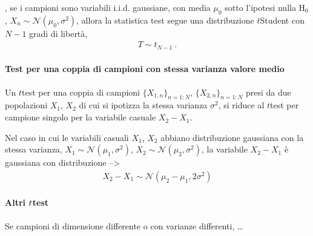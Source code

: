 \documentclass[letterpaper,10pt,italian]{jupyterBook}
\begin{document}
\sphinxAtStartPar
{}
{\hyperref[\detokenize{ch/proofs:proof-t-test-gaussian}]{}}, se i campioni sono variabili i.i.d. gaussiane, con media \(\mu_0\) sotto l’ipotesi nulla \(\text{H}_0\), \(X_n \sim \mathscr{N}(\mu_0, \sigma^2)\), allora la statistica test segue una distribuzione \(t\)\sphinxhyphen{}Student con \(N-1\) gradi di libertà,
\begin{equation*}
\begin{split}T \sim t_{N-1} \ .\end{split}
\end{equation*}
\sphinxAtStartPar
{} 


\paragraph{Test per una coppia di campioni con stessa varianza \sphinxhyphen{} valore medio}
\label{\detokenize{ch/statistics/hp-test-single:test-per-una-coppia-di-campioni-con-stessa-varianza-valore-medio}}\label{\detokenize{ch/statistics/hp-test-single:hp-test-single-t-tests-pair}}
\sphinxAtStartPar
Un \(t\)\sphinxhyphen{}test per una coppia di campioni \(\{ X_{1,n} \}_{n=1:N}\), \(\{ X_{2,n} \}_{n=1:N}\) presi da due popolazioni \(X_1\), \(X_2\) di cui si ipotizza la stessa varianza \(\sigma^2\), si riduce al \(t\)\sphinxhyphen{}test per campione singolo per la variabile casuale \(X_2 - X_1\).

\sphinxAtStartPar
{} Nel caso in cui le variabili casuali \(X_1\), \(X_2\) abbiano distribuzione gaussiana con la stessa varianza, \(X_1 \sim \mathscr{N}(\mu_1, \sigma^2)\), \(X_2 \sim \mathscr{N}(\mu_2, \sigma^2)\), la variabile \(X_2 - X_1\) è gaussiana con distribuzione
–>
\begin{equation*}
\begin{split}X_2 - X_1 \sim \mathscr{N}(\mu_2-\mu_1, 2 \sigma^2)\end{split}
\end{equation*}
\sphinxAtStartPar
{}


\paragraph{Altri \protect\(t\protect\)\sphinxhyphen{}test}
\label{\detokenize{ch/statistics/hp-test-single:altri-t-test}}\label{\detokenize{ch/statistics/hp-test-single:hp-test-single-t-tests-others}}
\sphinxAtStartPar
{} Se campioni di dimensione differente o con varianze differenti, {\hyperref[\detokenize{ch/statistics/hp-test-independence:hp-test-independence-t-welch}]{}}…
\end{document}
